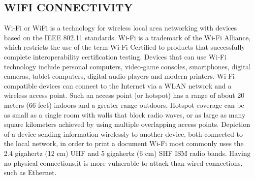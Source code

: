 \documentclass[12pt]{report} %
\begin{document}
\subsection{WIFI CONNECTIVITY}
\label{subsec:WIFI CONNECTIVITY}
Wi-Fi or WiFi is a technology for wireless local area networking with devices based on the IEEE 802.11 standards. Wi-Fi is a trademark of the Wi-Fi Alliance, which restricts the use of the term Wi-Fi Certified to products that successfully complete interoperability certification testing.
Devices that can use Wi-Fi technology include personal computers, video-game consoles, smartphones, digital cameras, tablet computers, digital audio players and modern printers. Wi-Fi compatible devices can connect to the Internet via a WLAN network and a wireless access point. Such an access point (or hotspot) has a range of about 20 meters (66 feet) indoors and a greater range outdoors. Hotspot coverage can be as small as a single room with walls that block radio waves, or as large as many square kilometers achieved by using multiple overlapping access points.
Depiction of a device sending information wirelessly to another device, both connected to the local network, in order to print a document
Wi-Fi most commonly uses the 2.4 gigahertz (12 cm) UHF and 5 gigahertz (6 cm) SHF ISM radio bands. Having no physical connections,it is more vulnerable to attack than wired connections, such as Ethernet.
\end{document}
